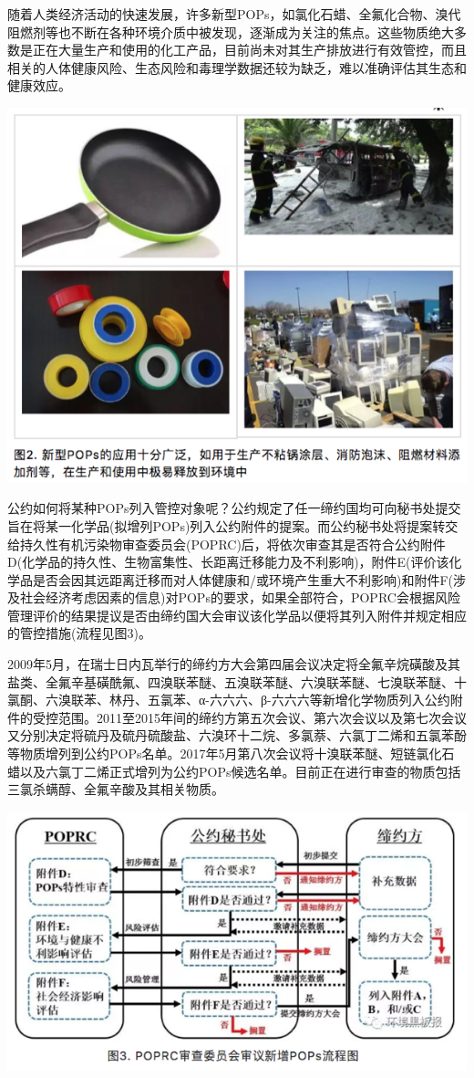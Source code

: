 \documentclass[]{book}
\begin{document}
随着人类经济活动的快速发展，许多新型POPs，如氯化石蜡、全氟化合物、溴代阻燃剂等也不断在各种环境介质中被发现，逐渐成为关注的焦点。这些物质绝大多数是正在大量生产和使用的化工产品，目前尚未对其生产排放进行有效管控，而且相关的人体健康风险、生态风险和毒理学数据还较为缺乏，难以准确评估其生态和健康效应。

\includegraphics[width=8.33in]{images/gongyue2}

公约如何将某种POPs列入管控对象呢？公约规定了任一缔约国均可向秘书处提交旨在将某一化学品(拟增列POPs)列入公约附件的提案。而公约秘书处将提案转交给持久性有机污染物审查委员会(POPRC)后，将依次审查其是否符合公约附件D(化学品的持久性、生物富集性、长距离迁移能力及不利影响)，附件E(评价该化学品是否会因其远距离迁移而对人体健康和/或环境产生重大不利影响)和附件F(涉及社会经济考虑因素的信息)对POPs的要求，如果全部符合，POPRC会根据风险管理评价的结果提议是否由缔约国大会审议该化学品以便将其列入附件并规定相应的管控措施(流程见图3)。

2009年5月，在瑞士日内瓦举行的缔约方大会第四届会议决定将全氟辛烷磺酸及其盐类、全氟辛基磺酰氟、四溴联苯醚、五溴联苯醚、六溴联苯醚、七溴联苯醚、十氯酮、六溴联苯、林丹、五氯苯、α-六六六、β-六六六等新增化学物质列入公约附件的受控范围。2011至2015年间的缔约方第五次会议、第六次会议以及第七次会议又分别决定将硫丹及硫丹硫酸盐、六溴环十二烷、多氯萘、六氯丁二烯和五氯苯酚等物质增列到公约POPs名单。2017年5月第八次会议将十溴联苯醚、短链氯化石蜡以及六氯丁二烯正式增列为公约POPs候选名单。目前正在进行审查的物质包括三氯杀螨醇、全氟辛酸及其相关物质。

\includegraphics[width=8.33in]{images/gongyue3}
\end{document}
